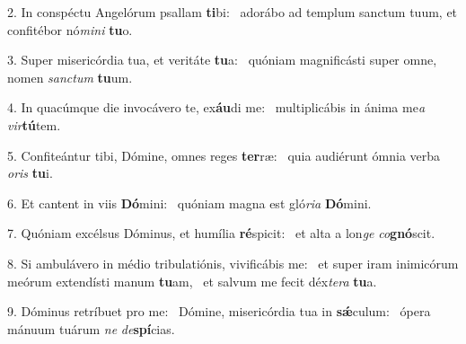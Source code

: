 2. In conspéctu Angelórum psallam \textbf{ti}bi: \ast\  adorábo ad templum sanctum tuum, et confitébor nó\textit{mi}\textit{ni} \textbf{tu}o.\

3. Super misericórdia tua, et veritáte \textbf{tu}a: \ast\  quóniam magnificásti super omne, nomen \textit{sanc}\textit{tum} \textbf{tu}um.\

4. In quacúmque die invocávero te, ex\textbf{áu}di me: \ast\  multiplicábis in ánima me\textit{a} \textit{vir}\textbf{tú}tem.\

5. Confiteántur tibi, Dómine, omnes reges \textbf{ter}ræ: \ast\  quia audiérunt ómnia verba \textit{o}\textit{ris} \textbf{tu}i.\

6. Et cantent in viis \textbf{Dó}mini: \ast\  quóniam magna est gló\textit{ri}\textit{a} \textbf{Dó}mini.\

7. Quóniam excélsus Dóminus, et humília \textbf{ré}spicit: \ast\  et alta a lon\textit{ge} \textit{co}\textbf{gnó}scit.\

8. Si ambulávero in médio tribulatiónis, vivificábis me: \dag\  et super iram inimicórum meórum extendísti manum \textbf{tu}am, \ast\  et salvum me fecit déx\textit{te}\textit{ra} \textbf{tu}a.\

9. Dóminus retríbuet pro me: \dag\  Dómine, misericórdia tua in \textbf{sǽ}culum: \ast\  ópera mánuum tuárum \textit{ne} \textit{de}\textbf{spí}cias.\


